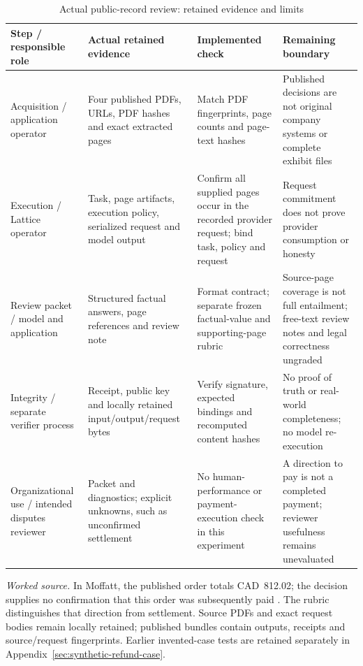 \begin{table}[!htbp]
\centering
\caption{Actual public-record review: retained evidence and limits}
\label{tab:public-refund-evidence}
\footnotesize{}
\begin{tabularx}{\textwidth}{@{}>{\raggedright\arraybackslash}p{27mm}>{\raggedright\arraybackslash}X>{\raggedright\arraybackslash}X>{\raggedright\arraybackslash}X@{}}
\toprule
Step / responsible role & Actual retained evidence & Implemented check & Remaining boundary \\
\midrule
Acquisition / application operator & Four published PDFs, URLs, PDF hashes and exact extracted pages & Match PDF fingerprints, page counts and page-text hashes & Published decisions are not original company systems or complete exhibit files \\[4pt]
Execution / Lattice operator & Task, page artifacts, execution policy, serialized request and model output & Confirm all supplied pages occur in the recorded provider request; bind task, policy and request & Request commitment does not prove provider consumption or honesty \\[4pt]
Review packet / model and application & Structured factual answers, page references and review note & Format contract; separate frozen factual-value and supporting-page rubric & Source-page coverage is not full entailment; free-text review notes and legal correctness ungraded \\[4pt]
Integrity / separate verifier process & Receipt, public key and locally retained input/output/request bytes & Verify signature, expected bindings and recomputed content hashes & No proof of truth or real-world completeness; no model re-execution \\[4pt]
Organizational use / intended disputes reviewer & Packet and diagnostics; explicit unknowns, such as unconfirmed settlement & No human-performance or payment-execution check in this experiment & A direction to pay is not a completed payment; reviewer usefulness remains unevaluated \\
\bottomrule
\end{tabularx}
\begin{minipage}{\textwidth}\footnotesize{}\smallskip
\textit{Worked source.} In Moffatt, the published order totals CAD~812.02; the decision supplies no confirmation that this order was subsequently paid \citep[para.~44]{moffatt2024}. The rubric distinguishes that direction from settlement. Source PDFs and exact request bodies remain locally retained; published bundles contain outputs, receipts and source/request fingerprints. Earlier invented-case tests are retained separately in Appendix~\ref{sec:synthetic-refund-case}.
\end{minipage}
\end{table}
